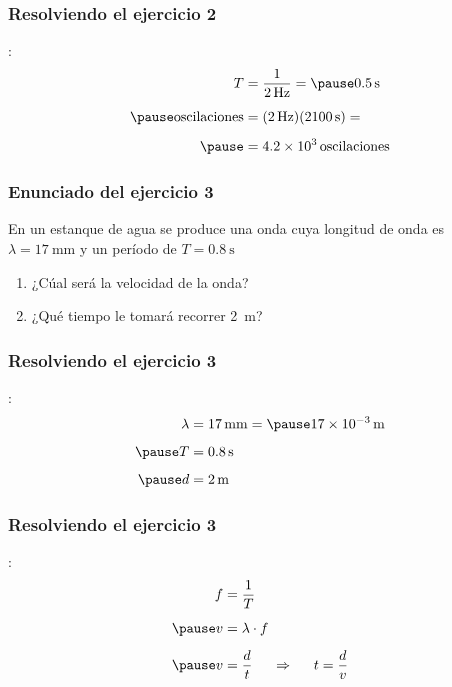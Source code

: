 \documentclass[14pt]{beamer}
\begin{document}
\begin{frame}
\frametitle{Resolviendo el ejercicio 2}
:
\begin{eqnarray*}
\begin{aligned}
T &= \dfrac{1}{\SI{2}{\hertz}} = \pause \SI{0.5}{\second} \\[0.5em] \pause
\text{oscilaciones} &= (\SI{2}{\hertz})(\SI{2100}{\second}) = \\[0.5em] \pause
&= \num{4.2d3} \, \text{oscilaciones}
\end{aligned}
\end{eqnarray*}
\end{frame}
\begin{frame}
\frametitle{Enunciado del ejercicio 3}
En un estanque de agua se produce una onda cuya longitud de onda es $\lambda = \SI{17}{\milli\meter}$ y un período de $T = \SI{0.8}{\second}$
\pause
{}
\begin{enumerate}[<+->]
\item ¿Cúal será la velocidad de la onda?
\item ¿Qué tiempo le tomará recorrer \SI{2}{\meter}?
\end{enumerate}
\end{frame}
\begin{frame}
\frametitle{Resolviendo el ejercicio 3}
:
\pause
\begin{eqnarray*}
\begin{aligned}
\lambda &= \SI{17}{\milli\meter} = \pause \SI{17d-3}{\meter}\\[0.5em] \pause
T &= \SI{0.8}{\second} \\[0.5em] \pause
d &= \SI{2}{\meter}
\end{aligned}
\end{eqnarray*}
\end{frame}
\begin{frame}
\frametitle{Resolviendo el ejercicio 3}
:
\begin{eqnarray*}
\begin{aligned}
f &= \dfrac{1}{T} \\[0.5em] \pause
v &= \lambda \cdot f \\[0.5em] \pause
v &= \dfrac{d}{t} \hspace{0.5cm} \Rightarrow \hspace{0.5cm} t = \dfrac{d}{v}
\end{aligned}
\end{eqnarray*}
\end{frame}
\end{document}
